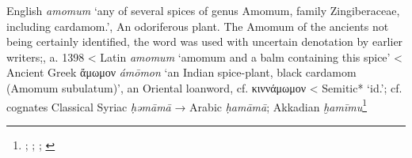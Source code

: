 \begin{etymology}\label{ety:amomum}
English \textit{amomum} `any of several spices of genus Amomum, family Zingiberaceae, including cardamom.', An odoriferous plant. The Amomum of the ancients not being certainly identified, the word was used with uncertain denotation by earlier writers;, a. 1398
< Latin \textit{amomum} `amomum and a balm containing this spice'
< Ancient Greek {ἄμωμον} \textit{ámōmon} `an Indian spice-plant, black cardamom (Amomum subulatum)', an Oriental loanword, cf. κιννάμωμον
< Semitic* `id.'; cf. cognates Classical Syriac  \textit{ḥəmāmā} → Arabic  \textit{ḥamāmā}; Akkadian \textit{ḫamīmu}\footnote{\textcite[s.v. amomum]{oed}; \textcite{lewis_latin_1879}; \textcites[]{liddell_greek-english_1940}[97]{beekes_etymological_2010}; \textcites[169]{low_aramaeische_1881}[100]{lev_practical_2008}[Vol. 6, p. 66]{roth_assyrian_2004}}
\end{etymology}
